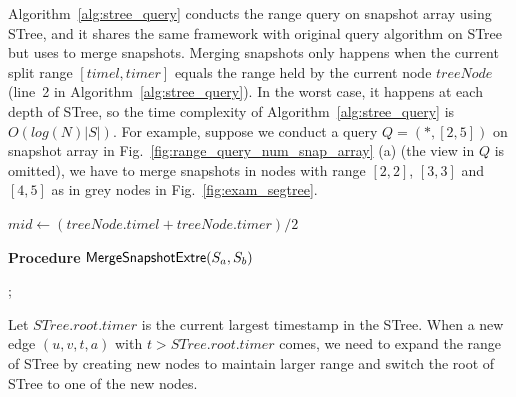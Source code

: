 \documentclass[10pt,journal,compsoc]{IEEEtran}
\begin{document}
 Algorithm~\ref{alg:stree_query} conducts the range query on snapshot array using STree, and it shares the same framework with original query algorithm on STree but uses  to merge snapshots. Merging snapshots only happens when the current split range $ [timel,timer] $ equals the range held by the current node $ treeNode $ (line~2 in Algorithm~\ref{alg:stree_query}). In the worst case, it happens at each depth of STree, so the time complexity of Algorithm~\ref{alg:stree_query} is $ O(log(N)|S|) $. For example, suppose we conduct a query $ Q=(\ast,[2,5]) $ on snapshot array in Fig.~\ref{fig:range_query_num_snap_array} (a) (the view in $ Q $ is omitted), we have to merge snapshots in nodes with range $ [2,2] $, $ [3,3] $ and $ [4,5] $ as in grey nodes in Fig.~\ref{fig:exam_segtree}.
\begin{algorithm}[t]
	\scriptsize
	\caption{$\kw{STreeQuery(treeNode,timel,timer,ans)}$}
	\label{alg:stree_query}
	$ mid \gets (treeNode.timel+treeNode.timer)/2 $\;

\vspace*{0.2cm}
	{\bf Procedure} {${\mathsf{MergeSnapshotExtre}}(S_a,S_b)$}
	
	\Return;
\end{algorithm}

 Let $ STree.root.timer $ is the current largest timestamp in the STree. When a new edge $ (u,v,t,a) $ with $t>STree.root.timer $ comes, we need to expand the range of STree by creating new nodes to maintain larger range and switch the root of STree to one of the new nodes.

\end{document}

